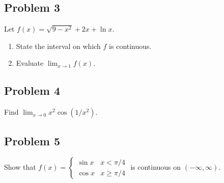 \documentclass[10pt]{book}
\theoremstyle{definition}
\begin{document}
\subsection*{Problem 3}
Let $f(x)=\sqrt{9-x^2}+2x+\ln x$.
\begin{enumerate}[label=(\alph*)]
    \item State the interval on which $f$ is continuous.\vspace{3cm}
    \item Evaluate $\displaystyle\lim_{x\rightarrow 1}f(x)$.\vspace{3cm}
\end{enumerate}
\subsection*{Problem 4}
Find $\displaystyle\lim_{x\rightarrow 0}x^2\cos(1/x^2).$
\vspace{4cm}
\subsection*{Problem 5} Show that $f(x)=\begin{cases}\sin x & x<\pi/4\\ \cos x & x\geq \pi/4\end{cases}$ is continuous on $(-\infty,\infty)$.
\end{document}
